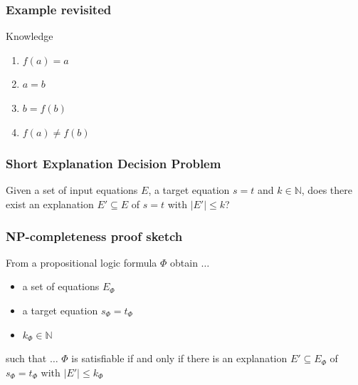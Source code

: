 \documentclass{beamer}
\begin{document}
\begin{frame}

\frametitle{Example revisited}

\begin{block}{Knowledge}
	\begin{enumerate}
		\item $f(a) = a$
		\item $a = b$
		\item $b = f(b)$
		\item $f(a) \neq f(b)$
	\end{enumerate}
\end{block}

\end{frame}

\begin{frame}

\frametitle{Short Explanation Decision Problem}

\centering Given a set of input equations $E$, a target equation $s = t$ and $k \in \mathbb{N}$, does there exist an explanation $E' \subseteq E$ of $s = t$ with $|E'| \leq k$?


\end{frame}

\begin{frame}

\frametitle{NP-completeness proof sketch}

\begin{block}{From a propositional logic formula $\Phi$ obtain $\ldots$}

	\begin{itemize}
		\item a set of equations $E_{\Phi}$
		\item a target equation $s_{\Phi} = t_{\Phi}$
		\item $k_{\Phi} \in \mathbb{N}$
	\end{itemize}
\end{block}

\begin{block}{such that $\ldots$}
	$\Phi$ is satisfiable if and only if there is an explanation $E' \subseteq E_{\Phi}$ of $s_{\Phi} = t_{\Phi}$ with $|E'| \leq k_{\Phi}$
\end{block}


\end{frame}
\end{document}
